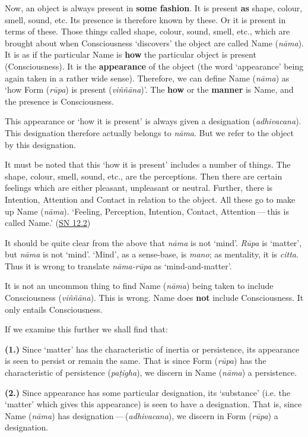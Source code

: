 Now, an object is always present in \textbf{some fashion}. It is present \textbf{as} shape, colour, smell, sound, etc. Its presence is therefore known by these. Or it is present in terms of these. Those things called shape, colour, sound, smell, etc., which are brought about when Consciousness `discovers' the object are called Name (\emph{nāma}). It is as if the particular Name is \textbf{how} the particular object is present (Consciousness). It is the \textbf{appearance} of the object (the word `appearance' being again taken in a rather wide sense). Therefore, we can define Name (\emph{nāma}) as `how Form (\emph{rūpa}) is present (\emph{viññāna})'. The \textbf{how} or the \textbf{manner} is Name, and the presence is Consciousness.

This appearance or `how it is present' is always given a designation (\emph{adhivacana}). This designation therefore actually belongs to \emph{nāma}. But we refer to the object by this designation.

It must be noted that this `how it is present' includes a number of things. The shape, colour, smell, sound, etc., are the perceptions. Then there are certain feelings which are either pleasant, unpleasant or neutral. Further, there is Intention, Attention and Contact in relation to the object. All these go to make up Name (\emph{nāma}). `Feeling, Perception, Intention, Contact, Attention --- this is called Name.' (\href{https://suttacentral.net/sn12.2/en/bodhi}{SN 12.2})

It should be quite clear from the above that \emph{nāma} is not `mind'. \emph{Rūpa} is `matter', but \emph{nāma} is not `mind'. `Mind', as a sense-base, is \emph{mano}; as mentality, it is \emph{citta}. Thus it is wrong to translate \emph{nāma-rūpa} as `mind-and-matter'.

It is not an uncommon thing to find Name (\emph{nāma}) being taken to include Consciousness (\emph{viññāna}). This is wrong. Name does \textbf{not} include Consciousness. It only entails Consciousness.

If we examine this further we shall find that:

\textbf{(1.)} Since `matter' has the characteristic of inertia or persistence, its appearance is seen to persist or remain the same. That is since Form (\emph{rūpa}) has the characteristic of persistence (\emph{paṭigha}), we discern in Name (\emph{nāma}) a persistence.

\textbf{(2.)} Since appearance has some particular designation, its `substance' (i.e. the `matter' which gives this appearance) is seen to have a designation. That is, since Name (\emph{nāma}) has designation --- (\emph{adhivacana}), we discern in Form (\emph{rūpa}) a designation.

